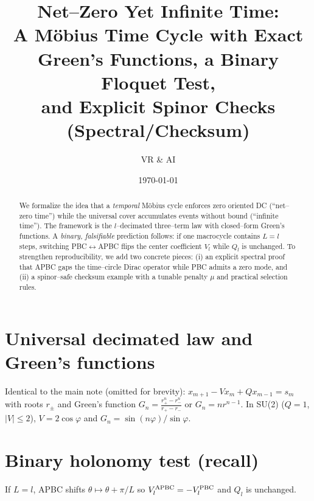 \documentclass[11pt]{article}
\title{\textbf{Net--Zero Yet Infinite Time:\\
A M\"obius Time Cycle with Exact Green's Functions, a Binary Floquet Test,\\
and Explicit Spinor Checks (Spectral/Checksum)}}
\author{VR \& AI}
\date{\today}
\theoremstyle{definition}
\theoremstyle{remark}
\begin{document}
\maketitle

\begin{abstract}
We formalize the idea that a \emph{temporal} M\"obius cycle enforces zero oriented DC (``net--zero time'') while the universal cover accumulates events without bound (``infinite time'').
The framework is the $l$--decimated three--term law with closed--form Green's functions. A \emph{binary, falsifiable} prediction follows:
if one macrocycle contains $L=l$ steps, switching PBC$\leftrightarrow$APBC flips the center coefficient $V_l$ while $Q_l$ is unchanged.
To strengthen reproducibility, we add two concrete pieces: (i) an explicit spectral proof that APBC gaps the time--circle Dirac operator while PBC admits a zero mode,
and (ii) a spinor--safe checksum example with a tunable penalty $\mu$ and practical selection rules.
\end{abstract}

\section{Universal decimated law and Green's functions}
Identical to the main note (omitted for brevity): $x_{m+1}-Vx_m+Qx_{m-1}=s_m$ with roots $r_\pm$ and Green's function
$G_n=\tfrac{r_+^n-r_-^n}{r_+-r_-}$ or $G_n=n r^{n-1}$. In SU(2) ($Q=1$, $|V|\le 2$), $V=2\cos\varphi$ and $G_n=\sin(n\varphi)/\sin\varphi$.

\section{Binary holonomy test (recall)}
If $L=l$, APBC shifts $\theta\mapsto\theta+\pi/L$ so $V_l^{\rm APBC}=-V_l^{\rm PBC}$ and $Q_l$ is unchanged.
\end{document}
